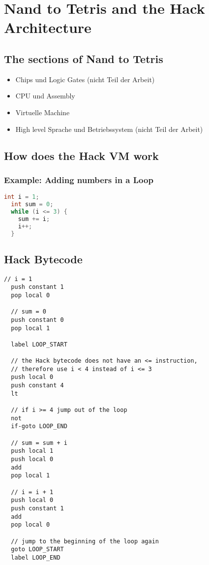 \section{Nand to Tetris and the Hack Architecture}
\subsection{The sections of Nand to Tetris}
\begin{itemize}
  \item Chips und Logic Gates (nicht Teil der Arbeit)
  \item CPU und Assembly
  \item Virtuelle Machine
  \item High level Sprache und Betriebssystem (nicht Teil der Arbeit)
\end{itemize}

\subsection{How does the Hack VM work}
\subsubsection{Example: Adding numbers in a Loop}
\begin{lstlisting}[language=C, caption={Calculate 1 + 2 + 3 in C}, captionpos=b]
  int i = 1;
  int sum = 0;
  while (i <= 3) {
    sum += i;
    i++;
  }
\end{lstlisting}

\subsection{Hack Bytecode}
\begin{lstlisting}[caption={Calculate 1 + 2 + 3 in the Hack VM}, captionpos=b]
  // i = 1
  push constant 1
  pop local 0

  // sum = 0
  push constant 0
  pop local 1

  label LOOP_START

  // the Hack bytecode does not have an <= instruction,
  // therefore use i < 4 instead of i <= 3
  push local 0
  push constant 4
  lt

  // if i >= 4 jump out of the loop
  not
  if-goto LOOP_END

  // sum = sum + i
  push local 1
  push local 0
  add
  pop local 1

  // i = i + 1
  push local 0
  push constant 1
  add
  pop local 0

  // jump to the beginning of the loop again
  goto LOOP_START
  label LOOP_END
\end{lstlisting}
